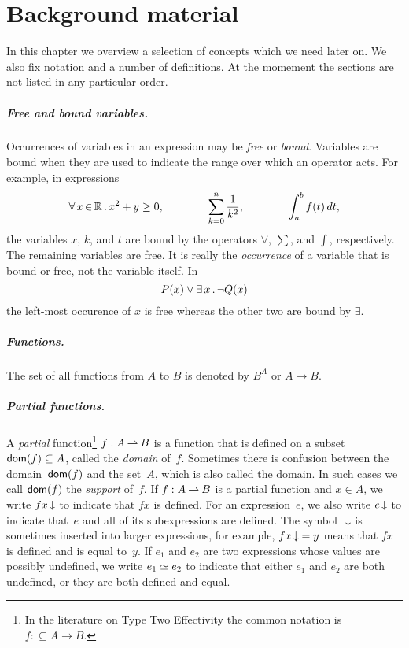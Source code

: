 \chapter{Background material}
\label{chap:background-material}

In this chapter we overview a selection of concepts which we need
later on. We also fix notation and a number of definitions. At the
momement the sections are not listed in any particular order.

\paragraph{Free and bound variables.}

Occurrences of variables in an expression may be \emph{free} or
\emph{bound}. Variables are bound when they are used to indicate the
range over which an operator acts. For example, in expressions
%
\begin{equation*}
  \forall\, x \,{\in}\, \mathbb{R}\,.\,x^2 + y \geq 0,
  \qquad\qquad
  \sum_{k = 0}^n \frac{1}{k^2},
  \qquad\qquad
  \int_a^b f(t) \, dt,
\end{equation*}
%
the variables $x$, $k$, and $t$ are bound by the operators $\forall$,
$\sum$, and $\int$, respectively. The remaining variables are free. It
is really the \emph{occurrence} of a variable that is bound or free,
not the variable itself. In
%
\begin{equation*}
  P(x) \lor \exists\, x\,.\,\lnot Q(x)
\end{equation*}
%
the left-most occurence of $x$ is free whereas the other two are bound
by $\exists$.

\paragraph{Functions.}

The set of all functions from $A$ to $B$ is denoted by $B^A$ or $A \to B$.

\paragraph{Partial functions.}

A \emph{partial} function\footnote{In the literature on Type Two
  Effectivity the common notation is $f \mathbin{{:}{\subseteq}} A \to
  B$.} $f: A \mathbin{\rightharpoonup} B$ is a function that is defined on a subset
$\mathsf{dom}(f) \subseteq A$, called the \emph{domain} of~$f$. Sometimes
there is confusion between the domain~$\mathsf{dom}(f)$ and the set~$A$, which
is also called the domain. In such cases we call $\mathsf{dom}(f)$ the
\emph{support} of~$f$. If $f: A \mathbin{\rightharpoonup} B$ is a partial function and $x
\in A$, we write $f x \,{\downarrow}$ to indicate that $f x$ is defined. For
an expression~$e$, we also write $e \,{\downarrow}$ to indicate that~$e$ and
all of its subexpressions are defined. The symbol~$\,{\downarrow}$ is
sometimes inserted into larger expressions, for example, $f x \,{\downarrow}
= y$ means that $f x$ is defined and is equal to~$y$. If $e_1$ and
$e_2$ are two expressions whose values are possibly undefined, we
write $e_1 \simeq e_2$ to indicate that either $e_1$ and $e_2$ are both
undefined, or they are both defined and equal.




